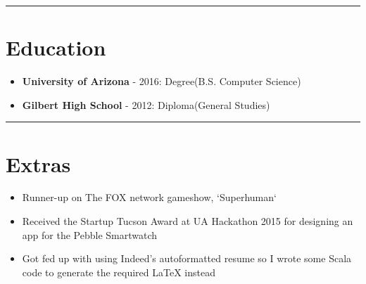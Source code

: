 \documentclass{article}
\begin{document}
\noindent\rule{\linewidth}{1pt}

\section*{Education}

\begin{itemize}\item \textbf{University of Arizona} - 2016: Degree(B.S. Computer Science)
\item \textbf{Gilbert High School} - 2012: Diploma(General Studies)\end{itemize}

\noindent\rule{\linewidth}{1pt}

\section*{Extras}

\begin{itemize}\item Runner-up on The FOX network gameshow, `Superhuman`
\item Received the Startup Tucson Award at UA Hackathon 2015 for designing an app for the Pebble Smartwatch
\item Got fed up with using Indeed's autoformatted resume so I wrote some Scala code to generate the required LaTeX instead\end{itemize}

\vspace*{\fill}

\end{document}
